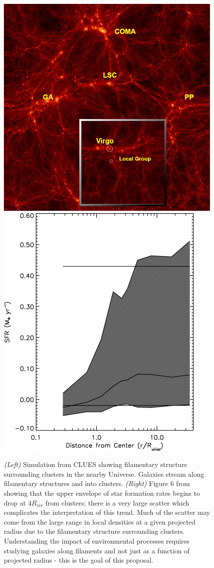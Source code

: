 \documentclass[11pt, preprint]{aastex}
\begin{document}
 \begin{figure}[h]
   \centering
 \includegraphics[width=.48\textwidth]{CLUES-DM.png}
\includegraphics[width=.39\textwidth]{gomez2003-fg6a.png}
   \caption{\small  {\it (Left) } Simulation from CLUES showing
     filamentary structure surrounding clusters in the nearby
     Universe.  Galaxies stream along filamentary structures and into clusters.
{\it (Right)}  Figure 6 from \citet{gomez03} showing that the upper
envelope of star formation rates begins to drop at $4R_{vir}$ from clusters;  there is a very
large scatter which complicates the interpretation of this trend.   Much
of the scatter may come from the large range in local densities at a given
projected radius due to the filamentary structure surrounding clusters.
Understanding the impact of environmental processes requires studying galaxies along
filaments and not just as a function of projected radius - this is the goal of this proposal.}
     \label{fig1}
 \end{figure}
\end{document}

